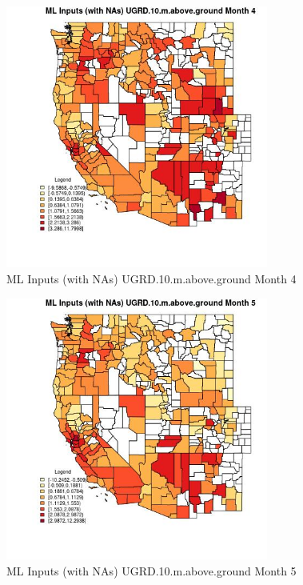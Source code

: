 \begin{figure} 
\centering  
\includegraphics[width=0.77\textwidth]{Code_Outputs/Report_ML_input_PM25_Step4_part_f_de_duplicated_aves_prioritize_24hr_obswNAs_CountyUGRD10mabovegroundmedianMonth4.jpg} 
\caption{\label{fig:Report_ML_input_PM25_Step4_part_f_de_duplicated_aves_prioritize_24hr_obswNAsCountyUGRD10mabovegroundmedianMonth4}ML Inputs (with NAs) UGRD.10.m.above.ground Month 4} 
\end{figure} 
 

\begin{figure} 
\centering  
\includegraphics[width=0.77\textwidth]{Code_Outputs/Report_ML_input_PM25_Step4_part_f_de_duplicated_aves_prioritize_24hr_obswNAs_CountyUGRD10mabovegroundmedianMonth5.jpg} 
\caption{\label{fig:Report_ML_input_PM25_Step4_part_f_de_duplicated_aves_prioritize_24hr_obswNAsCountyUGRD10mabovegroundmedianMonth5}ML Inputs (with NAs) UGRD.10.m.above.ground Month 5} 
\end{figure} 
 

